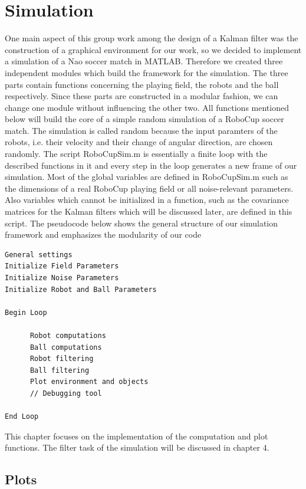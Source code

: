 
\chapter{Simulation}

One main aspect of this group work among the design of a Kalman filter was the construction of a graphical environment for our work, so we decided to implement a simulation of a Nao soccer match in MATLAB. Therefore we created three independent modules which build the framework for the simulation. The three parts contain functions concerning the playing field, the robots and the ball respectively. Since these parts are constructed in a modular fashion, we can change one module without influencing the other two. All functions mentioned below will build the core of a simple random simulation of a RoboCup soccer match. The simulation is called random because the input paramters of the robots, i.e. their velocity and their change of angular direction, are chosen randomly. The script {\selectfont RoboCupSim.m} is essentially a finite loop with the described functions in it and every step in the loop generates a new frame of our simulation. Most of the global variables are defined in {\selectfont RoboCupSim.m} such as the dimensions of a real RoboCup playing field or all noise-relevant parameters. Also variables which cannot be initialized in a function, such as the covariance matrices for the Kalman filters which will be discussed later, are defined in this script. The pseudocode below shows the general structure of our simulation framework and emphasizes the modularity of our code

\begin{verbatim}
General settings
Initialize Field Parameters
Initialize Noise Parameters
Initialize Robot and Ball Parameters

Begin Loop
	
      Robot computations
      Ball computations
      Robot filtering
      Ball filtering
      Plot environment and objects
      // Debugging tool
	
End Loop
\end{verbatim}

This chapter focuses on the implementation of the computation and plot functions. The filter task of the simulation will be discussed in chapter 4.


\section{Plots}


